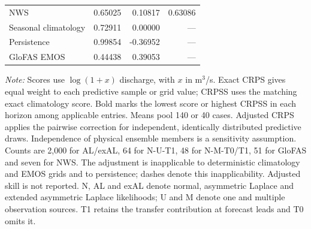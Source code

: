 \begin{table}[!htbp]
\begin{threeparttable}
\begin{tabular}{lrrr}
NWS & 0.65025 & 0.10817 & 0.63086 \\
Seasonal climatology & 0.72911 & 0.00000 & --- \\
Persistence & 0.99854 & -0.36952 & --- \\
GloFAS EMOS & 0.44438 & 0.39053 & --- \\
\hline
\end{tabular}
\begin{tablenotes}\footnotesize
\item \textit{Note:} Scores use $\log(1+x)$ discharge, with $x$ in m$^3$/s. Exact CRPS gives equal weight to each predictive sample or grid value; CRPSS uses the matching exact climatology score. Bold marks the lowest score or highest CRPSS in each horizon among applicable entries. Means pool 140 or 40 cases. Adjusted CRPS applies the pairwise correction for independent, identically distributed predictive draws. Independence of physical ensemble members is a sensitivity assumption. Counts are 2,000 for AL/exAL, 64 for N-U-T1, 48 for N-M-T0/T1, 51 for GloFAS and seven for NWS. The adjustment is inapplicable to deterministic climatology and EMOS grids and to persistence; dashes denote this inapplicability. Adjusted skill is not reported. N, AL and exAL denote normal, asymmetric Laplace and extended asymmetric Laplace likelihoods; U and M denote one and multiple observation sources. T1 retains the transfer contribution at forecast leads and T0 omits it.
\end{tablenotes}
\end{threeparttable}
\end{table}
